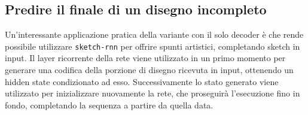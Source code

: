 \subsection{Predire il finale di un disegno incompleto} %
\label{sub:predire_il_finale_di_un_disegno_incompleto}
Un'interessante applicazione pratica della variante con il solo decoder è che rende possibile utilizzare \texttt{sketch-rnn} per offrire spunti artistici, completando sketch in input. Il layer ricorrente della rete viene utilizzato in un primo momento per generare una codifica della porzione di disegno ricevuta in input, ottenendo un hidden state condizionato ad esso. Successivamente lo stato generato viene utilizzato per inizializzare nuovamente la rete, che proseguirà l'esecuzione fino in fondo, completando la sequenza a partire da quella data.

\begin{minipage}{\linewidth}
\begin{lstlisting}[language = Python, frame = single, caption = {}, captionpos = b]

\end{lstlisting}
\end{minipage}
